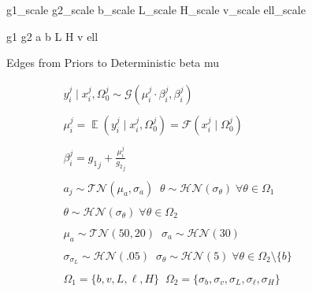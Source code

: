 \documentclass[a4paper,12pt]{article}
\DeclareMathOperator{\E}{\mathbb{E}}
\begin{document}
\begin{minipage}{.5\textwidth}
\begin{figure}[H]
{            %
             {g1_scale}
             {g2_scale}
             {b_scale}
             {L_scale}
             {H_scale}
             {v_scale}
             {ell_scale}

             {g1}
             {g2}
             {a}
             {b}
             {L}
             {H}
             {v}
             {ell}

            Edges from Priors to Deterministic
             {beta}
             {mu}
        }
    \end{figure}
\end{minipage}
\begin{minipage}{.6\textwidth}
    \begin{align*}
        &y_i^j \mid x_i^j, \Omega_0^j \sim \mathcal{G}\left(\mu_i^j\cdot\beta_i^j, \beta_i^j\right)\\\\
        &\mu_i^j = \E\left(y_i^j \mid x_i^j, \Omega_0^j\right) = \mathcal{F}\left(x_i^j \mid \Omega_0^j\right)\\\\
        &\beta_i^j = {g_1}_j + \frac{\mu_i^j}{{g_2}_j}\\\\
        & a_j \sim \mathcal{TN}\left(\mu_a, \sigma_a\right) \;\; \theta \sim \mathcal{HN}\left(\sigma_{\theta}\right) \; \forall \theta \in \Omega_1\\\\
        & \theta \sim \mathcal{HN}\left(\sigma_{\theta}\right) \; \forall \theta \in \Omega_2 \\\\
        & \mu_a \sim \mathcal{TN}\left(50, 20\right)\;\; \sigma_a \sim \mathcal{HN}\left(30\right)\\\\
        &\sigma_{\sigma_L} \sim \mathcal{HN}\left(.05\right) \;\; \sigma_\theta \sim \mathcal{HN}\left(5\right) \;\forall \theta \in \Omega_2 \setminus \{b\}\\\\
        &\Omega_1 = \{b, v, L, \ell, H\} \;\; \Omega_2 = \{\sigma_b, \sigma_v, \sigma_L, \sigma_{\ell}, \sigma_H\}
    \end{align*}
\end{minipage}
\end{document}
